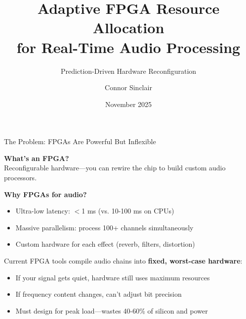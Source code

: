 \documentclass[aspectratio=169,11pt]{beamer}
\title[Adaptive FPGA for Audio DSP]{Adaptive FPGA Resource Allocation\\for Real-Time Audio Processing}
\subtitle{Prediction-Driven Hardware Reconfiguration}
\author{Connor Sinclair}
\institute{University of Sydney}
\date{November 2025}
\begin{document}
\begin{frame}
\titlepage
\end{frame}

\begin{frame}{The Problem: FPGAs Are Powerful But Inflexible}

\textbf{What's an FPGA?}\\
Reconfigurable hardware—you can rewire the chip to build custom audio processors.

\vspace{0.4cm}

\textbf{Why FPGAs for audio?}
\begin{itemize}
    \item Ultra-low latency: $<$1 ms (vs. 10-100 ms on CPUs)
    \item Massive parallelism: process 100+ channels simultaneously
    \item Custom hardware for each effect (reverb, filters, distortion)
\end{itemize}

\vspace{0.4cm}

\begin{tcolorbox}[colback=red!10,colframe=red!60,title=\textbf{The Problem}]
Current FPGA tools compile audio chains into \textbf{fixed, worst-case hardware}:
\begin{itemize}
    \item[$\times$] If your signal gets quiet, hardware still uses maximum resources
    \item[$\times$] If frequency content changes, can't adjust bit precision
    \item[$\times$] Must design for peak load—wastes 40-60\% of silicon and power
\end{itemize}
\end{tcolorbox}

\end{frame}
\end{document}
